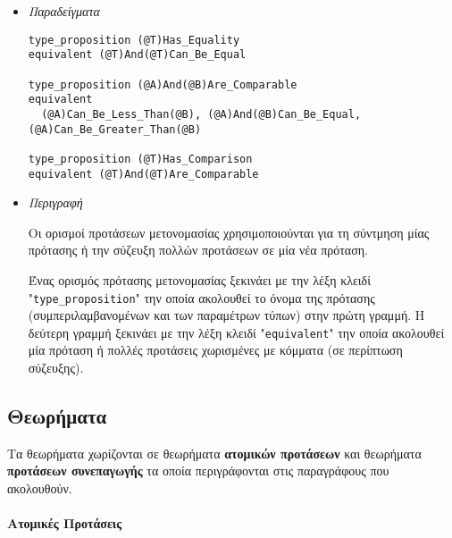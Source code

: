 \documentclass[diploma]{softlab-thesis}
\begin{document}
\begin{itemize}
\item \textit{Παραδείγματα}
\begin{verbatim}
type_proposition (@T)Has_Equality
equivalent (@T)And(@T)Can_Be_Equal

type_proposition (@A)And(@B)Are_Comparable
equivalent
  (@A)Can_Be_Less_Than(@B), (@A)And(@B)Can_Be_Equal, (@A)Can_Be_Greater_Than(@B)

type_proposition (@T)Has_Comparison
equivalent (@T)And(@T)Are_Comparable
\end{verbatim}

\item \textit{Περιγραφή}

Οι ορισμοί προτάσεων μετονομασίας χρησιμοποιούνται για τη σύντμηση μίας
πρότασης ή την σύζευξη πολλών προτάσεων σε μία νέα πρόταση.

Ένας ορισμός πρότασης μετονομασίας ξεκινάει με την λέξη κλειδί
"\verb|type_proposition|" την οποία ακολουθεί το όνομα της πρότασης
(συμπεριλαμβανομένων και των παραμέτρων τύπων) στην πρώτη γραμμή.
Η δεύτερη γραμμή ξεκινάει με την λέξη κλειδί "\verb|equivalent|"
την οποία ακολουθεί μία πρόταση ή πολλές προτάσεις χωρισμένες με κόμματα
(σε περίπτωση σύζευξης).

\end{itemize}

\newpage
\subsection{Θεωρήματα}

Τα θεωρήματα χωρίζονται σε θεωρήματα \textbf{ατομικών προτάσεων} και
θεωρήματα \textbf{προτάσεων συνεπαγωγής} τα οποία περιγράφονται στις
παραγράφους που ακολουθούν.

\paragraph{Ατομικές Προτάσεις}
\end{document}
